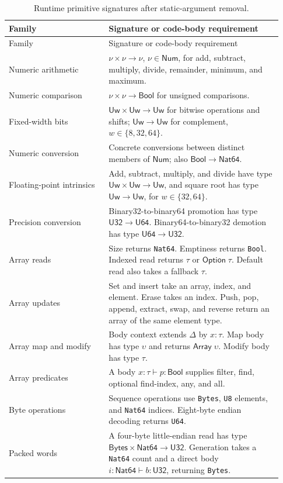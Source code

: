 \documentclass[11pt]{article}
\newcommand{\code}[1]{\texttt{#1}}
\newcommand{\ty}[1]{\mathsf{#1}}
\begin{document}
\begin{longtable}{L{0.34\linewidth}L{0.59\linewidth}}
\caption{Runtime primitive signatures after static-argument removal.}\label{tab:primitives}\\
\toprule Family & Signature or code-body requirement\\\midrule\endfirsthead
\toprule Family & Signature or code-body requirement\\\midrule\endhead
Numeric arithmetic & $\nu\times\nu\to\nu$, $\nu\in\ty{Num}$, for add, subtract, multiply, divide, remainder, minimum, and maximum.\\
Numeric comparison & $\nu\times\nu\to\ty{Bool}$ for unsigned comparisons.\\
Fixed-width bits & $\ty{Uw}\times\ty{Uw}\to\ty{Uw}$ for bitwise operations and shifts; $\ty{Uw}\to\ty{Uw}$ for complement, $w\in\{8,32,64\}$.\\
Numeric conversion & Concrete conversions between distinct members of $\ty{Num}$; also $\ty{Bool}\to\ty{Nat64}$.\\
Floating-point intrinsics & Add, subtract, multiply, and divide have type $\ty{Uw}\times\ty{Uw}\to\ty{Uw}$, and square root has type $\ty{Uw}\to\ty{Uw}$, for $w\in\{32,64\}$.\\
Precision conversion & Binary32-to-binary64 promotion has type $\ty{U32}\to\ty{U64}$.  Binary64-to-binary32 demotion has type $\ty{U64}\to\ty{U32}$.\\
Array reads & Size returns \code{Nat64}.  Emptiness returns \code{Bool}.  Indexed read returns $\tau$ or $\ty{Option}\;\tau$.  Default read also takes a fallback $\tau$.\\
Array updates & Set and insert take an array, index, and element.  Erase takes an index.  Push, pop, append, extract, swap, and reverse return an array of the same element type.\\
Array map and modify & Body context extends $\Delta$ by $x:\tau$.  Map body has type $\upsilon$ and returns $\ty{Array}\;\upsilon$.  Modify body has type $\tau$.\\
Array predicates & A body $x:\tau\vdash p:\ty{Bool}$ supplies filter, find, optional find-index, any, and all.\\
Byte operations & Sequence operations use \code{Bytes}, \code{U8} elements, and \code{Nat64} indices.  Eight-byte endian decoding returns \code{U64}.\\
Packed words & A four-byte little-endian read has type $\ty{Bytes}\times\ty{Nat64}\to\ty{U32}$.  Generation takes a \code{Nat64} count and a direct body $i:\ty{Nat64}\vdash b:\ty{U32}$, returning \code{Bytes}.\\

\end{longtable}
\end{document}
